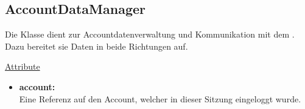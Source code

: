 \newpage
\subsection{AccountDataManager}\label{AccountDataManager}
Die Klasse dient zur Accountdatenverwaltung und Kommunikation mit dem . Dazu bereitet sie Daten in beide Richtungen auf.

\underline{Attribute}
\begin{itemize}
\itemsep0pt

\item \textbf{account: } \hfill\\ 
Eine Referenz auf den Account, welcher in dieser Sitzung eingeloggt wurde.

\end{itemize}

